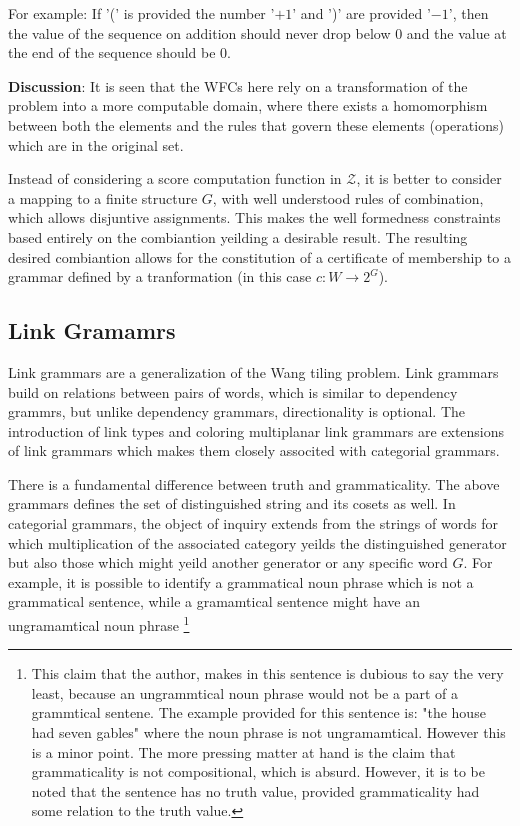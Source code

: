 \documentclass{report}
\begin{document}
For example: If '(' is provided the number '$+1$' and ')' are provided '$-1$',
then the value of the sequence on addition should never drop below $0$ and the
value at the end of the sequence should be $0$.

\textbf{Discussion}: It is seen that the WFCs here rely on a transformation of
the problem into a more computable domain, where there exists a homomorphism
between both the elements and the rules that govern these elements (operations)
which are in the original set.

Instead of considering a score computation function in $\mathcal{Z}$, it is
better to consider a mapping to a finite structure $G$, with well understood
rules of combination, which allows disjuntive assignments. This makes the well
formedness constraints based entirely on the combiantion yeilding a desirable
result. The resulting desired combiantion allows for the constitution of a
certificate of membership to a grammar defined by a tranformation (in this case
$c: W \rightarrow 2^G$).

\subsection{Link Gramamrs}

Link grammars are a generalization of the Wang tiling problem. Link grammars
build on relations between pairs of words, which is similar to dependency
grammrs, but unlike dependency grammars, directionality is optional. The
introduction of link types and coloring multiplanar link grammars are
extensions of link grammars which makes them closely associted with categorial
grammars.

There is a fundamental difference between truth and grammaticality. The above
grammars defines the set of distinguished string and its cosets as well.
In categorial grammars, the object of inquiry extends from the strings of
words for which multiplication of the associated category yeilds the
distinguished generator but also those which might yeild another generator
or any specific word $G$. For example, it is possible to identify a grammatical
noun phrase which is not a grammatical sentence, while a gramamtical sentence
might have an ungramamtical noun phrase \footnote{This claim that the author,
makes in this sentence is dubious to say the very least, because an
ungrammtical noun phrase would not be a part of a grammtical sentene. The
example provided for this sentence is: "the house had seven gables" where the
noun phrase is not ungramamtical. However this is a minor point. The more
pressing matter at hand is the claim that grammaticality is not compositional,
which is absurd. However, it is to be noted that the sentence has no truth
value, provided grammaticality had some relation to the truth value.}
\end{document}
